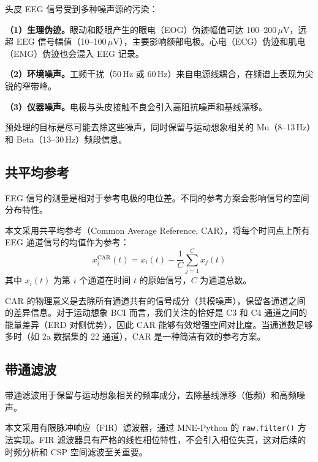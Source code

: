 头皮 EEG 信号受到多种噪声源的污染：

\textbf{（1）生理伪迹。}眼动和眨眼产生的眼电（EOG）伪迹幅值可达 100--200\,$\mu$V，远超 EEG 信号幅值（10--100\,$\mu$V），主要影响额部电极。心电（ECG）伪迹和肌电（EMG）伪迹也会混入 EEG 记录。

\textbf{（2）环境噪声。}工频干扰（50\,Hz 或 60\,Hz）来自电源线耦合，在频谱上表现为尖锐的窄带峰。

\textbf{（3）仪器噪声。}电极与头皮接触不良会引入高阻抗噪声和基线漂移。

预处理的目标是尽可能去除这些噪声，同时保留与运动想象相关的 Mu（8--13\,Hz）和 Beta（13--30\,Hz）频段信息。

\subsection{共平均参考}
\label{sec:car}

EEG 信号的测量是相对于参考电极的电位差。不同的参考方案会影响信号的空间分布特性。

本文采用共平均参考（Common Average Reference, CAR），将每个时间点上所有 EEG 通道信号的均值作为参考：
\begin{equation}\label{eq:car}
x_i^{\text{CAR}}(t) = x_i(t) - \frac{1}{C} \sum_{j=1}^{C} x_j(t)
\end{equation}
其中 $x_i(t)$ 为第 $i$ 个通道在时间 $t$ 的原始信号，$C$ 为通道总数。

CAR 的物理意义是去除所有通道共有的信号成分（共模噪声），保留各通道之间的差异信息。对于运动想象 BCI 而言，我们关注的恰好是 C3 和 C4 通道之间的能量差异（ERD 对侧优势），因此 CAR 能够有效增强空间对比度。当通道数足够多时（如 2a 数据集的 22 通道），CAR 是一种简洁有效的参考方案。

\subsection{带通滤波}
\label{sec:bandpass}

带通滤波用于保留与运动想象相关的频率成分，去除基线漂移（低频）和高频噪声。

本文采用有限脉冲响应（FIR）滤波器，通过 MNE-Python 的 \texttt{raw.filter()} 方法实现。FIR 滤波器具有严格的线性相位特性，不会引入相位失真，这对后续的时频分析和 CSP 空间滤波至关重要。

